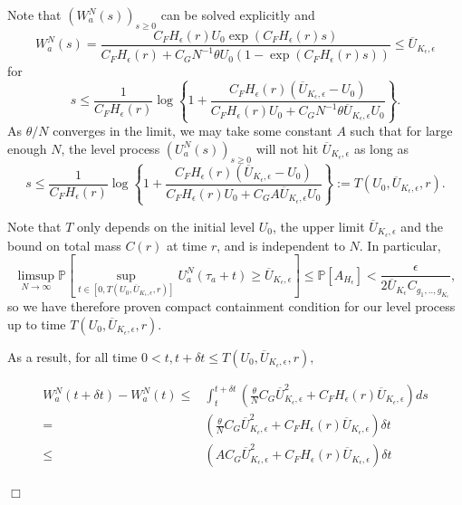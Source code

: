 \documentclass[12pt]{article}
\newenvironment {proof}{{\noindent\bf Proof }}{\hfill $\Box$ \medskip}
\begin{document}
\begin{proof}
Note that $(W^N_a(s))_{s \geq 0}$ can be solved explicitly and 
\begin{equation}
W^N_a(s) = \frac{C_F H_{\epsilon}(r) U_0 \exp(C_F H_{\epsilon}(r) s)}{C_F H_{\epsilon}(r)+C_G  N^{-1}\theta U_0(1- \exp(C_F H_{\epsilon}(r) s))}\leq \overline{U}_{K_{\epsilon}, \epsilon}    
\end{equation}
for 
\begin{equation}
    \label{eq: Bound on Level Hitting Time}
s \leq  \frac{1}{C_F H_{\epsilon}(r)} \log\left\{
1+
\frac{C_F H_{\epsilon}(r)
(\overline{U}_{K_{\epsilon}, \epsilon}
-U_0)
}
{C_F H_{\epsilon}(r)U_0 +C_G  N^{-1}\theta \overline{U}_{K_{\epsilon}, \epsilon}    U_0}
\right\}.
\end{equation}
As $\theta / N $ converges in the limit, we may take some constant $A$ such that for large enough $N$,
the level process $(U^N_{a}(s))_{s \geq 0}$ will not hit  $\overline{U}_{K_{\epsilon}, \epsilon}$ as long as
\begin{equation}
s \leq  \frac{1}{C_F H_{\epsilon}(r)} \log\left\{
1+
\frac{C_F H_{\epsilon}(r)
(\overline{U}_{K_{\epsilon}, \epsilon}
-U_0)
}
{C_F H_{\epsilon}(r)U_0 +C_G  A \overline{U}_{K_{\epsilon},\epsilon}    U_0}
\right\}:=T(U_0,\overline{U}_{K_{\epsilon},\epsilon},r).
\end{equation}

Note that $T$ only depends on the initial level $U_0$, the upper limit $\overline{U}_{K_{\epsilon}, \epsilon}$ and the bound on total mass $C(r)$ at time $r$, and is independent to $N$. 
In particular, 
\begin{equation}
\label{eq: Compact Containment for Levels}
\limsup_{N \to \infty}
\mathbb{P}\left[
\sup_{t \in [0, T(U_0,\overline{U}_{K_{\epsilon},\epsilon},r)]}
U^N_{a}(\tau_a + t)
\geq \overline{U}_{K_{\epsilon},\epsilon} 
\right]  
\leq \mathbb{P}[A_{H_{\epsilon}}]
< \frac{\epsilon}{2 \overline{U}_{K_{\epsilon}}C_{g_1,..,g_{K_{\epsilon}}}},
\end{equation}
so we have therefore proven compact containment condition for our level process up to time $T(U_0,\overline{U}_{K_{\epsilon},\epsilon},r)$.

As a result, for all time $ 0 < t , t+ \delta t \leq T(U_0,\overline{U}_{K_{\epsilon},\epsilon},r),$

\begin{align*}
W^N_a(t+\delta t)-W^N_a(t) 
\leq &\int_{t}^{t+\delta t} 
        \left( \frac{\theta}{N} C_G \overline{U}_{K_{\epsilon}, \epsilon}^2
        +
        C_F H_{\epsilon}(r) \overline{U}_{K_{\epsilon}, \epsilon}
        \right)
        ds\\
=&\left( \frac{\theta}{N} C_G \overline{U}_{K_{\epsilon}, \epsilon}^2
        +
        C_F H_{\epsilon}(r) \overline{U}_{K_{\epsilon}, \epsilon}
        \right) \delta t \\
\leq&\left( A C_G \overline{U}_{K_{\epsilon}, \epsilon}^2
        +
        C_F H_{\epsilon}(r) \overline{U}_{K_{\epsilon}, \epsilon}
        \right) \delta t
\end{align*}


\end{proof}
\end{document}
